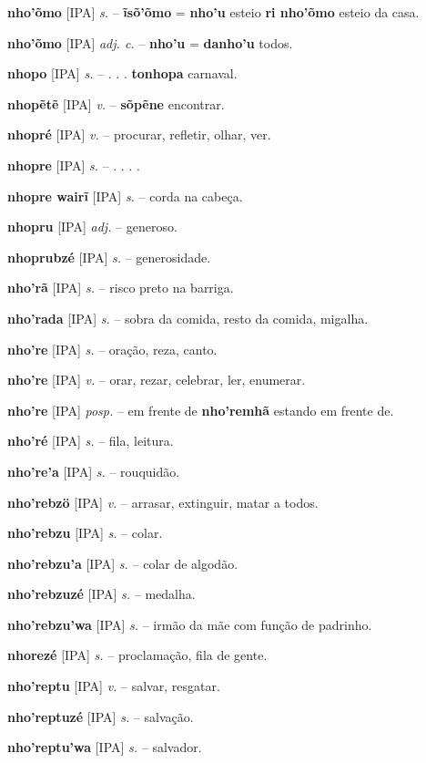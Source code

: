 \textbf{nho'õmo} [IPA] \textit{s.} -- \textbf{ĩsõ'õmo} = \textbf{nho'u} esteio  \textbf{ri nho'õmo} esteio da casa.

\textbf{nho'õmo} [IPA] \textit{adj. c.} -- \textbf{nho'u} = \textbf{danho'u} todos.

\textbf{nhopo} [IPA] \textit{s.} -- . . .  \textbf{tonhopa} carnaval.

\textbf{nhopẽtẽ} [IPA] \textit{v.} -- \textbf{sõpẽne} encontrar.

\textbf{nhopré} [IPA] \textit{v.} -- procurar, refletir, olhar, ver.

\textbf{nhopre} [IPA] \textit{s.} -- . . . .

\textbf{nhopre wairĩ} [IPA] \textit{s.} -- corda na cabeça.

\textbf{nhopru} [IPA] \textit{adj.} -- generoso.

\textbf{nhoprubzé} [IPA] \textit{s.} -- generosidade.

\textbf{nho'rã} [IPA] \textit{s.} -- risco preto na barriga.

\textbf{nho'rada} [IPA] \textit{s.} -- sobra da comida, resto da comida, migalha.

\textbf{nho're} [IPA] \textit{s.} -- oração, reza, canto.

\textbf{nho're} [IPA] \textit{v.} -- orar, rezar, celebrar, ler, enumerar.

\textbf{nho're} [IPA] \textit{posp.} -- em frente de  \textbf{nho'remhã} estando em frente de.

\textbf{nho'ré} [IPA] \textit{s.} -- fila, leitura.

\textbf{nho're'a} [IPA] \textit{s.} -- rouquidão.

\textbf{nho'rebzö} [IPA] \textit{v.} -- arrasar, extinguir, matar a todos.

\textbf{nho'rebzu} [IPA] \textit{s.} -- colar.

\textbf{nho'rebzu'a} [IPA] \textit{s.} -- colar de algodão.

\textbf{nho'rebzuzé} [IPA] \textit{s.} -- medalha.

\textbf{nho'rebzu'wa} [IPA] \textit{s.} -- irmão da mãe com função de padrinho.

\textbf{nhorezé} [IPA] \textit{s.} -- proclamação, fila de gente.

\textbf{nho'reptu} [IPA] \textit{v.} -- salvar, resgatar.

\textbf{nho'reptuzé} [IPA] \textit{s.} -- salvação.

\textbf{nho'reptu'wa} [IPA] \textit{s.} -- salvador.

